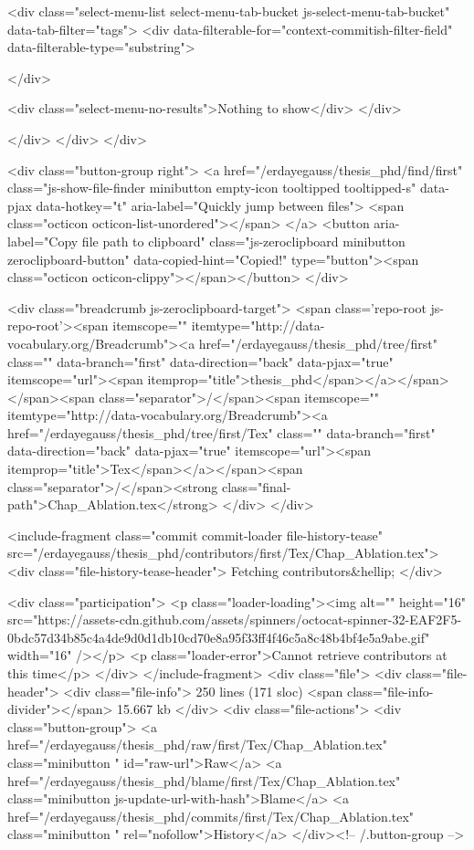       <div class="select-menu-list select-menu-tab-bucket js-select-menu-tab-bucket" data-tab-filter="tags">
        <div data-filterable-for="context-commitish-filter-field" data-filterable-type="substring">


        </div>

        <div class="select-menu-no-results">Nothing to show</div>
      </div>

    </div>
  </div>
</div>

  <div class="button-group right">
    <a href="/erdayegauss/thesis_phd/find/first"
          class="js-show-file-finder minibutton empty-icon tooltipped tooltipped-s"
          data-pjax
          data-hotkey="t"
          aria-label="Quickly jump between files">
      <span class="octicon octicon-list-unordered"></span>
    </a>
    <button aria-label="Copy file path to clipboard" class="js-zeroclipboard minibutton zeroclipboard-button" data-copied-hint="Copied!" type="button"><span class="octicon octicon-clippy"></span></button>
  </div>

  <div class="breadcrumb js-zeroclipboard-target">
    <span class='repo-root js-repo-root'><span itemscope="" itemtype="http://data-vocabulary.org/Breadcrumb"><a href="/erdayegauss/thesis_phd/tree/first" class="" data-branch="first" data-direction="back" data-pjax="true" itemscope="url"><span itemprop="title">thesis_phd</span></a></span></span><span class="separator">/</span><span itemscope="" itemtype="http://data-vocabulary.org/Breadcrumb"><a href="/erdayegauss/thesis_phd/tree/first/Tex" class="" data-branch="first" data-direction="back" data-pjax="true" itemscope="url"><span itemprop="title">Tex</span></a></span><span class="separator">/</span><strong class="final-path">Chap_Ablation.tex</strong>
  </div>
</div>

<include-fragment class="commit commit-loader file-history-tease" src="/erdayegauss/thesis_phd/contributors/first/Tex/Chap_Ablation.tex">
  <div class="file-history-tease-header">
    Fetching contributors&hellip;
  </div>

  <div class="participation">
    <p class="loader-loading"><img alt="" height="16" src="https://assets-cdn.github.com/assets/spinners/octocat-spinner-32-EAF2F5-0bdc57d34b85c4a4de9d0d1db10cd70e8a95f33ff4f46c5a8c48b4bf4e5a9abe.gif" width="16" /></p>
    <p class="loader-error">Cannot retrieve contributors at this time</p>
  </div>
</include-fragment>
<div class="file">
  <div class="file-header">
    <div class="file-info">
        250 lines (171 sloc)
        <span class="file-info-divider"></span>
      15.667 kb
    </div>
    <div class="file-actions">
      <div class="button-group">
        <a href="/erdayegauss/thesis_phd/raw/first/Tex/Chap_Ablation.tex" class="minibutton " id="raw-url">Raw</a>
          <a href="/erdayegauss/thesis_phd/blame/first/Tex/Chap_Ablation.tex" class="minibutton js-update-url-with-hash">Blame</a>
        <a href="/erdayegauss/thesis_phd/commits/first/Tex/Chap_Ablation.tex" class="minibutton " rel="nofollow">History</a>
      </div><!-- /.button-group -->


